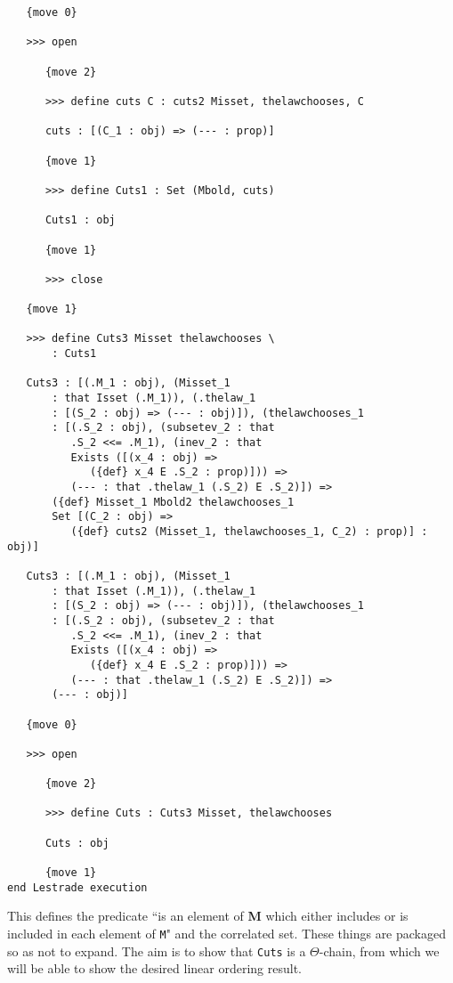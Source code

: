\documentclass[12pt]{article}
\begin{document}
\begin{verbatim}
   {move 0}

   >>> open

      {move 2}

      >>> define cuts C : cuts2 Misset, thelawchooses, C

      cuts : [(C_1 : obj) => (--- : prop)]

      {move 1}

      >>> define Cuts1 : Set (Mbold, cuts)

      Cuts1 : obj

      {move 1}

      >>> close

   {move 1}

   >>> define Cuts3 Misset thelawchooses \
       : Cuts1

   Cuts3 : [(.M_1 : obj), (Misset_1 
       : that Isset (.M_1)), (.thelaw_1 
       : [(S_2 : obj) => (--- : obj)]), (thelawchooses_1 
       : [(.S_2 : obj), (subsetev_2 : that 
          .S_2 <<= .M_1), (inev_2 : that 
          Exists ([(x_4 : obj) => 
             ({def} x_4 E .S_2 : prop)])) => 
          (--- : that .thelaw_1 (.S_2) E .S_2)]) => 
       ({def} Misset_1 Mbold2 thelawchooses_1 
       Set [(C_2 : obj) => 
          ({def} cuts2 (Misset_1, thelawchooses_1, C_2) : prop)] : obj)]

   Cuts3 : [(.M_1 : obj), (Misset_1 
       : that Isset (.M_1)), (.thelaw_1 
       : [(S_2 : obj) => (--- : obj)]), (thelawchooses_1 
       : [(.S_2 : obj), (subsetev_2 : that 
          .S_2 <<= .M_1), (inev_2 : that 
          Exists ([(x_4 : obj) => 
             ({def} x_4 E .S_2 : prop)])) => 
          (--- : that .thelaw_1 (.S_2) E .S_2)]) => 
       (--- : obj)]

   {move 0}

   >>> open

      {move 2}

      >>> define Cuts : Cuts3 Misset, thelawchooses

      Cuts : obj

      {move 1}
end Lestrade execution
\end{verbatim}

This defines the predicate ``is an element of {\bf M} which either includes or is included in each element of {\tt M}" and the correlated set.  These things are packaged so as not to expand.
The aim is to show that {\tt Cuts} is a $\Theta$-chain, from which we will be able to show the desired linear ordering result.
\end{document}

